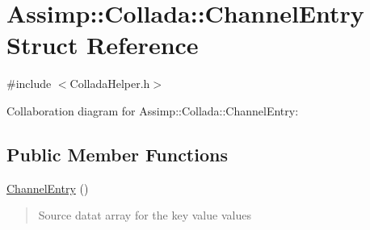 \hypertarget{struct_assimp_1_1_collada_1_1_channel_entry}{\section{Assimp\+:\+:Collada\+:\+:Channel\+Entry Struct Reference}
\label{struct_assimp_1_1_collada_1_1_channel_entry}
}


{\ttfamily \#include $<$Collada\+Helper.\+h$>$}



Collaboration diagram for Assimp\+:\+:Collada\+:\+:Channel\+Entry\+:
\subsection*{Public Member Functions}
\begin{DoxyCompactItemize}
\item 
\hypertarget{struct_assimp_1_1_collada_1_1_channel_entry_a7c1675105ba3927ad8edd6ca0d371417}{\hyperlink{struct_assimp_1_1_collada_1_1_channel_entry_a7c1675105ba3927ad8edd6ca0d371417}{Channel\+Entry} ()}\label{struct_assimp_1_1_collada_1_1_channel_entry_a7c1675105ba3927ad8edd6ca0d371417}

\begin{DoxyCompactList}\small\item\em \begin{quote}
Source datat array for the key value values \end{quote}
\end{DoxyCompactList}\end{DoxyCompactItemize}

